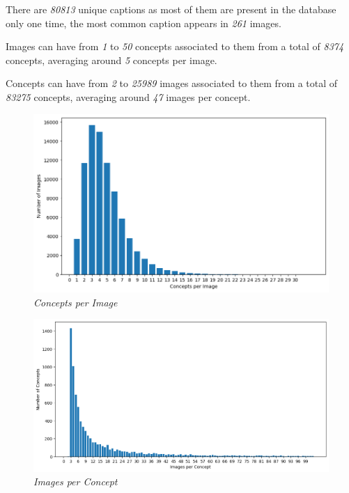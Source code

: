 \documentclass[10pt,twocolumn,letterpaper]{article}
\begin{document}
There are \textit{80813} unique captions as most of them are present in the database only one time, the most common caption appears in \textit{261} images.

Images can have from \textit{1} to \textit{50} concepts associated to them from a total of \textit{8374} concepts, averaging around \textit{5} concepts per image.

Concepts can have from \textit{2} to \textit{25989} images associated to them from a total of \textit{83275} concepts, averaging around \textit{47} images per concept.

\begin{figure}[H]
   \centering
   \includegraphics[width=1\linewidth]{img/Data_Exploration_2.png}
   \caption{\textit{Concepts per Image}}
\end{figure}
\begin{figure}[H]
   \centering
   \includegraphics[width=1\linewidth]{img/Data_Exploration_3.png}
   \caption{\textit{Images per Concept}}
\end{figure}


\end{document}
